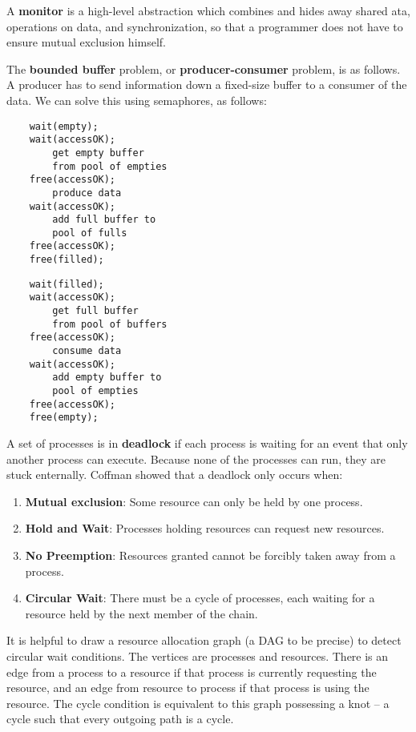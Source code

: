 A {\bf monitor} is a high-level abstraction which combines and hides away shared ata, operations on data, and synchronization, so that a programmer does not have to ensure mutual exclusion himself.

The {\bf bounded buffer} problem, or {\bf producer-consumer} problem, is as follows. A producer has to send information down a fixed-size buffer to a consumer of the data. We can solve this using semaphores, as follows:

\begin{multicols}{2}
\begin{verbatim}
    wait(empty);
    wait(accessOK);
        get empty buffer
        from pool of empties
    free(accessOK);
        produce data
    wait(accessOK);
        add full buffer to
        pool of fulls
    free(accessOK);
    free(filled);
\end{verbatim}

\begin{verbatim}
    wait(filled);
    wait(accessOK);
        get full buffer
        from pool of buffers
    free(accessOK);
        consume data
    wait(accessOK);
        add empty buffer to
        pool of empties
    free(accessOK);
    free(empty);
\end{verbatim}
\end{multicols}

A set of processes is in {\bf deadlock} if each process is waiting for an event that only another process can execute. Because none of the processes can run, they are stuck enternally. Coffman showed that a deadlock only occurs when:
%
\begin{enumerate}
    \item {\bf Mutual exclusion}: Some resource can only be held by one process.
    \item {\bf Hold and Wait}: Processes holding resources can request new resources.
    \item {\bf No Preemption}: Resources granted cannot be forcibly taken away from a process.
    \item {\bf Circular Wait}: There must be a cycle of processes, each waiting for a resource held by the next member of the chain.
\end{enumerate}
%
It is helpful to draw a resource allocation graph (a DAG to be precise) to detect circular wait conditions. The vertices are processes and resources. There is an edge from a process to a resource if that process is currently requesting the resource, and an edge from resource to process if that process is using the resource. The cycle condition is equivalent to this graph possessing a knot -- a cycle such that every outgoing path is a cycle.

